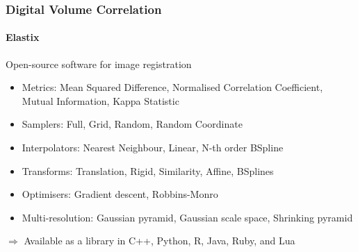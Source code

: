 \documentclass[xcolor=table,11pt]{beamer}
\begin{document}
	\begin{frame}
		\frametitle{Digital Volume Correlation}
		\framesubtitle{Elastix}
		Open-source software for image registration
		\begin{itemize}
			\item Metrics: Mean Squared Difference, Normalised Correlation Coefficient, Mutual Information, Kappa Statistic
			\item Samplers: Full, Grid, Random, Random Coordinate
			\item Interpolators: Nearest Neighbour, Linear, N-th order BSpline
			\item Transforms: Translation, Rigid, Similarity, Affine, BSplines
			\item Optimisers: Gradient descent, Robbins-Monro
			\item Multi-resolution: Gaussian pyramid, Gaussian scale space, Shrinking pyramid
		\end{itemize}
		\vfill
		$\Rightarrow$ Available as a library in C++, Python, R, Java, Ruby, and Lua
	\end{frame}
\end{document}
